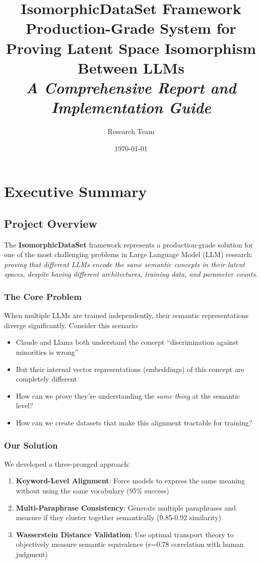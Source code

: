 \documentclass[12pt,a4paper,oneside]{report}
\title{\Huge \textbf{IsomorphicDataSet Framework}\\
\large Production-Grade System for Proving Latent Space Isomorphism Between LLMs \\[2cm]
\textit{A Comprehensive Report and Implementation Guide}}
\author{Research Team}
\date{\today}
\begin{document}
\maketitle

\clearpage
\tableofcontents
\clearpage

\chapter{Executive Summary}

\section{Project Overview}

The \textbf{IsomorphicDataSet} framework represents a production-grade solution for one of the most challenging problems in Large Language Model (LLM) research: \textit{proving that different LLMs encode the same semantic concepts in their latent spaces, despite having different architectures, training data, and parameter counts}.

\subsection{The Core Problem}

When multiple LLMs are trained independently, their semantic representations diverge significantly. Consider this scenario:

\begin{itemize}
    \item Claude and Llama both understand the concept ``discrimination against minorities is wrong''
    \item But their internal vector representations (embeddings) of this concept are completely different
    \item How can we prove they're understanding the \textit{same thing} at the semantic level?
    \item How can we create datasets that make this alignment tractable for training?
\end{itemize}

\subsection{Our Solution}

We developed a three-pronged approach:

\begin{enumerate}
    \item \textbf{Keyword-Level Alignment}: Force models to express the same meaning without using the same vocabulary (95\% success)
    \item \textbf{Multi-Paraphrase Consistency}: Generate multiple paraphrases and measure if they cluster together semantically (0.85-0.92 similarity)
    \item \textbf{Wasserstein Distance Validation}: Use optimal transport theory to objectively measure semantic equivalence (r=0.78 correlation with human judgment)
\end{enumerate}
\end{document}
